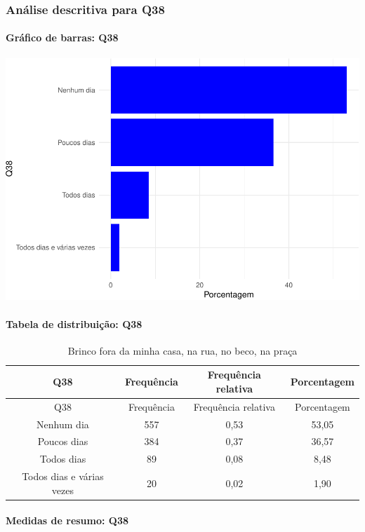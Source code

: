 \documentclass[]{article}
\let\oldparagraph\paragraph
\renewcommand{\paragraph}[1]{\oldparagraph{#1}\mbox{}}
\begin{document}
\hypertarget{anuxe1lise-descritiva-para-q38}{%
\subsubsection{Análise descritiva para Q38}\label{anuxe1lise-descritiva-para-q38}}

\hypertarget{gruxe1fico-de-barras-q38}{%
\paragraph{Gráfico de barras: Q38}\label{gruxe1fico-de-barras-q38}}

\begin{center}\includegraphics[width=0.75\linewidth]{relatorio_covid19_files/figure-latex/unnamed-chunk-1425-1} \end{center}

\hypertarget{tabela-de-distribuiuxe7uxe3o-q38}{%
\paragraph{Tabela de distribuição: Q38}\label{tabela-de-distribuiuxe7uxe3o-q38}}

\begin{longtable}[]{@{}cccc@{}}
\caption{\label{tab:unnamed-chunk-1426}Brinco fora da minha casa, na rua, no beco, na praça}\tabularnewline
\toprule
Q38 & Frequência & Frequência relativa & Porcentagem\tabularnewline
\midrule
\endfirsthead
\toprule
Q38 & Frequência & Frequência relativa & Porcentagem\tabularnewline
\midrule
\endhead
Nenhum dia & 557 & 0,53 & 53,05\tabularnewline
Poucos dias & 384 & 0,37 & 36,57\tabularnewline
Todos dias & 89 & 0,08 & 8,48\tabularnewline
Todos dias e várias vezes & 20 & 0,02 & 1,90\tabularnewline
\bottomrule
\end{longtable}

\hypertarget{medidas-de-resumo-q38}{%
\paragraph{Medidas de resumo: Q38}\label{medidas-de-resumo-q38}}
\end{document}
